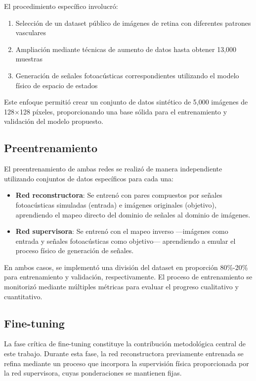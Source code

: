 El procedimiento específico involucró:

\begin{enumerate}
    \item Selección de un dataset público de imágenes de retina con diferentes patrones vasculares
    \item Ampliación mediante técnicas de aumento de datos hasta obtener 13,000 muestras
    \item Generación de señales fotoacústicas correspondientes utilizando el modelo físico de espacio de estados
\end{enumerate}

Este enfoque permitió crear un conjunto de datos sintético de 5,000 imágenes de 128$\times$128 píxeles, proporcionando una base sólida para el entrenamiento y validación del modelo propuesto.

\subsection{Preentrenamiento}

El preentrenamiento de ambas redes se realizó de manera independiente utilizando conjuntos de datos específicos para cada una:

\begin{itemize}
    \item \textbf{Red reconstructora}: Se entrenó con pares compuestos por señales fotoacústicas simuladas (entrada) e imágenes originales (objetivo), aprendiendo el mapeo directo del dominio de señales al dominio de imágenes.
    \item \textbf{Red supervisora}: Se entrenó con el mapeo inverso ---imágenes como entrada y señales fotoacústicas como objetivo--- aprendiendo a emular el proceso físico de generación de señales.
\end{itemize}

En ambos casos, se implementó una división del dataset en proporción 80\%-20\% para entrenamiento y validación, respectivamente. El proceso de entrenamiento se monitorizó mediante múltiples métricas para evaluar el progreso cualitativo y cuantitativo.

\subsection{Fine-tuning}

La fase crítica de fine-tuning constituye la contribución metodológica central de este trabajo. Durante esta fase, la red reconstructora previamente entrenada se refina mediante un proceso que incorpora la supervisión física proporcionada por la red supervisora, cuyas ponderaciones se mantienen fijas.

